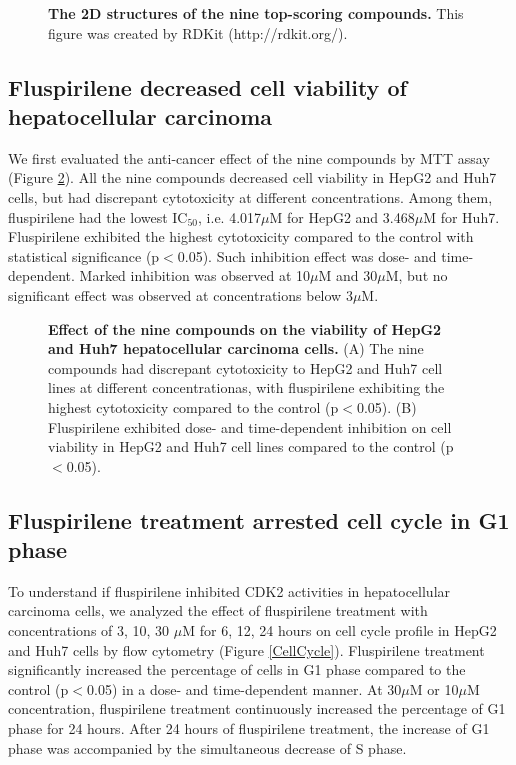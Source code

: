 \documentclass[10pt,letterpaper]{article}
\begin{document}
\begin{figure}%
\caption{{\bf The 2D structures of the nine top-scoring compounds.} This figure was created by RDKit (http://rdkit.org/). }
\label{Top9Structures}
\end{figure}

\subsection*{Fluspirilene decreased cell viability of hepatocellular carcinoma}

We first evaluated the anti-cancer effect of the nine compounds by MTT assay (Figure \ref{CellViability}). All the nine compounds decreased cell viability in HepG2 and Huh7 cells, but had discrepant cytotoxicity at different concentrations. Among them, fluspirilene had the lowest IC$_{50}$, i.e. 4.017$\mu$M for HepG2 and 3.468$\mu$M for Huh7. Fluspirilene exhibited the highest cytotoxicity compared to the control with statistical significance (p$<$0.05). Such inhibition effect was dose- and time-dependent. Marked inhibition was observed at 10$\mu$M and 30$\mu$M, but no significant effect was observed at concentrations below 3$\mu$M.

\begin{figure}%
\caption{{\bf Effect of the nine compounds on the viability of HepG2 and Huh7 hepatocellular carcinoma cells.} (A) The nine compounds had discrepant cytotoxicity to HepG2 and Huh7 cell lines at different concentrationas, with fluspirilene exhibiting the highest cytotoxicity compared to the control (p$<$0.05). (B) Fluspirilene exhibited dose- and time-dependent inhibition on cell viability in HepG2 and Huh7 cell lines compared to the control (p$<$0.05).}
\label{CellViability}
\end{figure}

\subsection*{Fluspirilene treatment arrested cell cycle in G1 phase}

To understand if fluspirilene inhibited CDK2 activities in hepatocellular carcinoma cells, we analyzed the effect of fluspirilene treatment with concentrations of 3, 10, 30 $\mu$M for 6, 12, 24 hours on cell cycle profile in HepG2 and Huh7 cells by flow cytometry (Figure \ref{CellCycle}). Fluspirilene treatment significantly increased the percentage of cells in G1 phase compared to the control (p$<$0.05) in a dose- and time-dependent manner. At 30$\mu$M or 10$\mu$M concentration, fluspirilene treatment continuously increased the percentage of G1 phase for 24 hours. After 24 hours of fluspirilene treatment, the increase of G1 phase was accompanied by the simultaneous decrease of S phase.
\end{document}
